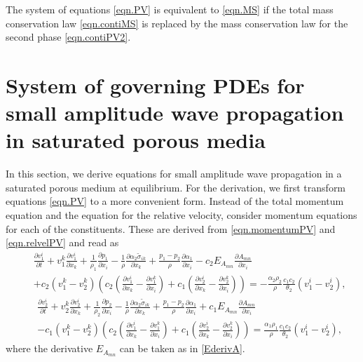 \documentclass[3p,times,table]{article}
\begin{document}
The system of equations \eqref{eqn.PV} is equivalent to \eqref{eqn.MS} if the
total mass conservation law 
\eqref{eqn.contiMS} is replaced by the mass conservation law for the second phase 
\eqref{eqn.contiPV2}.
 
\section{System of governing PDEs for small amplitude wave propagation in  
saturated porous media}\label{sec.linear}

In this section, we derive equations for small amplitude wave 
propagation in a saturated porous medium at equilibrium. For the 
derivation, we first transform equations \eqref{eqn.PV} to a more convenient form. 
Instead of the total momentum equation 
and the equation for the relative velocity, consider momentum equations for each of the
constituents. These are derived from \eqref{eqn.momentumPV} and 
\eqref{eqn.relvelPV} and read as
\begin{eqnarray}\label{eqns.momentum1.quasilinear}
&&\frac{\partial v^i_1}{\partial t}+v^k_1\frac{\partial v^i_1}{\partial x_k}+
\frac{1}{\rho_1}\frac{\partial p_1}{\partial x_i}- \frac{1}{\rho}
\frac{\partial \alpha_2 \tilde \sigma_{ik}}{\partial x_k}+\frac{p_1-p_2}{\rho}\frac{\partial \alpha_1}{\partial x_i} 
-c_2 E_{A_{mn}}\frac{\partial A_{mn}}{\partial x_i}\\ \nonumber
&&+c_2(v^k_1-v^k_2)\left(c_2\left(\frac{\partial v^i_1}{\partial x_k}-\frac{\partial v^k_1}{\partial x_i}\right)+c_1\left(\frac{\partial v^i_2}{\partial x_k}-\frac{\partial v^k_2}{\partial x_i}\right) \right)
=-\frac{\alpha_2 \rho_2}{\rho} \frac{c_1c_2}{\theta_2}(v_1^i-v_2^i),
\end{eqnarray}
\begin{eqnarray} \label{eqns.momentum2.quasilinear}
&&\frac{\partial v^i_2}{\partial t}+v^k_2\frac{\partial v^i_2}{\partial x_k}+
\frac{1}{\rho_2}\frac{\partial p_2}{\partial x_i}- \frac{1}{\rho}
\frac{\partial \alpha_2 \tilde \sigma_{ik}}{\partial x_k}+\frac{p_1-p_2}{\rho}\frac{\partial \alpha_1}{\partial x_i} 
+c_1 E_{A_{mn}}\frac{\partial A_{mn}}{\partial x_i}\\ \nonumber
&&-c_1(v^k_1-v^k_2)\left(c_2\left(\frac{\partial v^i_1}{\partial x_k}-\frac{\partial v^k_1}{\partial x_i}\right)+c_1\left(\frac{\partial v^i_2}{\partial x_k}-\frac{\partial v^k_2}{\partial x_i}\right) \right)
=\frac{\alpha_1 \rho_1}{\rho} \frac{c_1c_2}{\theta_2}(v_1^i-v_2^i),
\end{eqnarray}
where the derivative $ E_{A_{mn}} $ can be taken as in \eqref{EderivA}.
\end{document}

